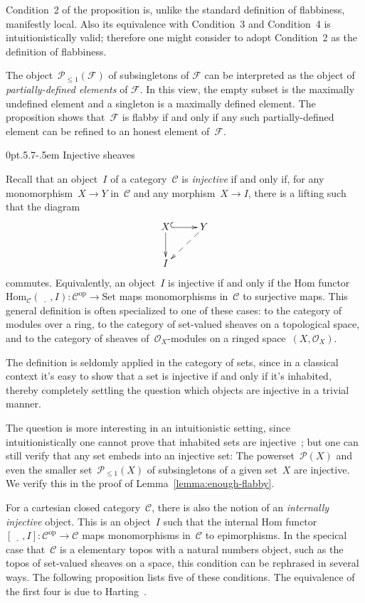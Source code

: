 \documentclass[10pt,reqno,a4paper]{amsbook}
\makeatletter
\theoremstyle{definition}
\theoremstyle{plain}
\theoremstyle{remark}
\renewcommand{\C}{\mathcal{C}}
\newcommand{\F}{\mathcal{F}}
\renewcommand{\O}{\mathcal{O}}
\renewcommand{\P}{\mathcal{P}}
\newcommand{\Hom}{\mathrm{Hom}}
\newcommand{\placeholder}{\underline{\quad}}
\newcommand{\Set}{\mathrm{Set}}
\newcommand{\op}{\mathrm{op}}
\newcommand{\?}{\,{:}\,}
\renewcommand{\_}{\mathpunct{.}\,}
\def\subsection{\@startsection{subsection}{2}%
  {0pt}{.5\linespacing\@plus.7\linespacing}{-.5em}%
  {\normalfont\bfseries}}
\makeatother
\begin{document}
Condition~2 of the proposition is, unlike the standard definition of flabbiness,
manifestly local. Also its equivalence with Condition~3 and Condition~4 is
intuitionistically valid; therefore one might consider to adopt Condition~2 as
the definition of flabbiness.

The object~$\P_{\leq 1}(\F)$ of subsingletons of $\F$ can be
interpreted as the object of \emph{partially-defined
elements} of $\F$. In this view, the empty subset is the maximally undefined
element and a singleton is a maximally defined element. The proposition shows
that~$\F$ is flabby if and only if any such partially-defined element can be
refined to an honest element of~$\F$.


\subsection{Injective sheaves}

Recall that an object~$I$ of a category~$\C$ is \emph{injective} if and only if,
for any monomorphism~$X \to Y$ in~$\C$ and any morphism~$X \to I$, there
is a lifting such that the diagram
\[ \xymatrix{
  X \ar@{^{(}->}[r]\ar[d] & Y \ar@{-->}[dl] \\
  I
} \]
commutes. Equivalently, an object~$I$ is injective if and only if the Hom
functor~$\Hom_\C(\placeholder, I) : \C^\op \to \Set$ maps monomorphisms in~$\C$ to
surjective maps. This general definition is often specialized to one of these cases:
to the category of modules over a ring, to the category of set-valued sheaves
on a topological space, and to the category of sheaves of~$\O_X$-modules on a
ringed space~$(X,\O_X)$.

The definition is seldomly applied in the category of sets, since in a classical
context it's easy to show that a set is injective if and only if it's
inhabited, thereby completely settling the question which objects are
injective in a trivial manner.

The question is more interesting in an intuitionistic setting, since
intuitionistically one cannot prove that inhabited sets are
injective~\cite{aczel-et-al:injective}; but one can still verify that any set embeds
into an injective set: The powerset~$\P(X)$ and even the smaller
set~$\P_{\leq1}(X)$ of subsingletons of a given set~$X$ are injective. We verify
this in the proof of Lemma~\ref{lemma:enough-flabby}.

For a cartesian closed category~$\C$, there is also the notion of an
\emph{internally injective} object. This is an object~$I$ such that the
internal Hom functor~$[\placeholder, I] : \C^\op \to \C$ maps monomorphisms
in~$\C$ to epimorphisms. In the specical case that~$\C$ is a elementary topos
with a natural numbers object, such as the topos of set-valued sheaves on a
space, this condition can be rephrased in several ways. The following
proposition lists five of these conditions. The equivalence of the first four is
due to Harting~\cite{harting}.
\end{document}
